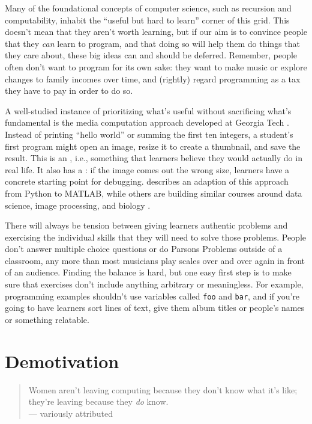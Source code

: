 Many of the foundational concepts of computer science, such as
recursion and computability, inhabit the ``useful but hard to learn''
corner of this grid. This doesn't mean that they aren't worth
learning, but if our aim is to convince people that they \emph{can}
learn to program, and that doing so will help them do things that they
care about, these big ideas can and should be deferred.  Remember,
people often don't want to program for its own sake: they want to make
music or explore changes to family incomes over time, and (rightly)
regard programming as a tax they have to pay in order to do so.

A well-studied instance of prioritizing what's useful without
sacrificing what's fundamental is the media computation approach
developed at Georgia Tech \cite{Guzd2013}.  Instead of printing
``hello world'' or summing the first ten integers, a student's first
program might open an image, resize it to create a thumbnail, and save
the result. This is an ,
i.e., something that learners believe they would actually do in real
life. It also has a :
if the image comes out the wrong size, learners have a concrete
starting point for debugging.  \cite{Lee2013} describes an adaption of
this approach from Python to MATLAB, while others are building similar
courses around data science, image processing, and biology
\cite{Dahl2018,Meys2018,Ritz2018}.

There will always be tension between giving learners authentic
problems and exercising the individual skills that they will need to
solve those problems.  People don't answer multiple choice questions
or do Parsons Problems outside of a classroom, any more than most
musicians play scales over and over again in front of an audience.
Finding the balance is hard, but one easy first step is to make sure
that exercises don't include anything arbitrary or meaningless.  For
example, programming examples shouldn't use variables called
\texttt{foo} and \texttt{bar}, and if you're going to have learners
sort lines of text, give them album titles or people's names or
something relatable.

\section{Demotivation}\label{s:motivation-demotivation}

\begin{quote}

  Women aren't leaving computing because they don't know what it's
  like; they're leaving because they \emph{do} know. \\
  --- variously attributed

\end{quote}

